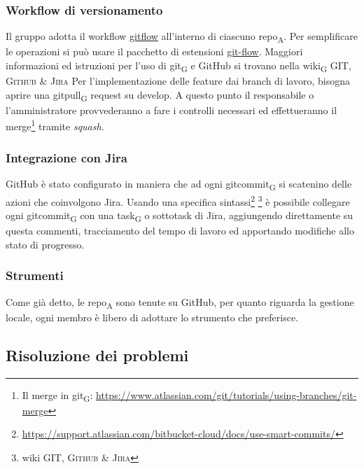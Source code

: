     \subsubsection{Workflow di versionamento}
        Il gruppo adotta il workflow \href{https://www.atlassian.com/git/tutorials/comparing-workflows/gitflow-workflow}{gitflow} all'interno di ciascuno \acrshort{repo}\textsubscript{A}. Per semplificare le operazioni si può usare il pacchetto di estensioni \href{http://danielkummer.github.io/git-flow-cheatsheet/}{git-flow}. Maggiori informazioni ed istruzioni per l'uso di \gls{git}\textsubscript{G} e GitHub si trovano nella \gls{wiki}\textsubscript{G} \textsc{GIT, Github \& Jira}
            Per l'implementazione delle feature dai branch di lavoro, bisogna aprire una \gls{gitpull}\textsubscript{G} request su develop. A questo punto il responsabile o l'amministratore provvederanno a fare i controlli necessari ed effettueranno il merge\footnote{Il merge in \gls{git}\textsubscript{G}: \url{https://www.atlassian.com/git/tutorials/using-branches/git-merge}} tramite \textit{squash}.

    \subsubsection{Integrazione con Jira}
    \label{jiraintegration}
        GitHub è stato configurato in maniera che ad ogni \gls{gitcommit}\textsubscript{G} si scatenino delle azioni che coinvolgono Jira. Usando una specifica sintassi\footnote{\url{https://support.atlassian.com/bitbucket-cloud/docs/use-smart-commits/}} \footnote{wiki \textsc{GIT, Github \& Jira}} è possibile collegare ogni \gls{gitcommit}\textsubscript{G} con una \gls{task}\textsubscript{G} o sottotask di Jira, aggiungendo direttamente su questa commenti, tracciamento del tempo di lavoro ed apportando modifiche allo stato di progresso.

    \subsubsection{Strumenti}
    Come già detto, le \acrshort{repo}\textsubscript{A} sono tenute su GitHub, per quanto riguarda la gestione locale, ogni membro è libero di adottare lo strumento che preferisce.


\subsection{Risoluzione dei problemi}
    \label{risoluzioneproblemi}
